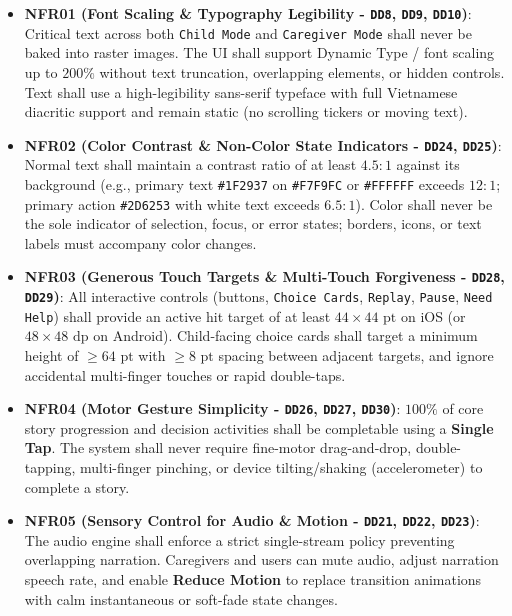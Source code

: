 \begin{itemize}
  \item \textbf{NFR01 (Font Scaling \& Typography Legibility - \texttt{DD8}, \texttt{DD9}, \texttt{DD10})}: Critical text across both \texttt{Child Mode} and \texttt{Caregiver Mode} shall never be baked into raster images. The UI shall support Dynamic Type / font scaling up to \textbf{$200\%$} without text truncation, overlapping elements, or hidden controls. Text shall use a high-legibility sans-serif typeface with full Vietnamese diacritic support and remain static (no scrolling tickers or moving text).
  \item \textbf{NFR02 (Color Contrast \& Non-Color State Indicators - \texttt{DD24}, \texttt{DD25})}: Normal text shall maintain a contrast ratio of at least \textbf{$4.5:1$} against its background (e.g., primary text \texttt{\#1F2937} on \texttt{\#F7F9FC} or \texttt{\#FFFFFF} exceeds $12:1$; primary action \texttt{\#2D6253} with white text exceeds $6.5:1$). Color shall never be the sole indicator of selection, focus, or error states; borders, icons, or text labels must accompany color changes.
  \item \textbf{NFR03 (Generous Touch Targets \& Multi-Touch Forgiveness - \texttt{DD28}, \texttt{DD29})}: All interactive controls (buttons, \texttt{Choice Cards}, \texttt{Replay}, \texttt{Pause}, \texttt{Need Help}) shall provide an active hit target of at least \textbf{$44 \times 44\text{ pt}$} on iOS (or \textbf{$48 \times 48\text{ dp}$} on Android). Child-facing choice cards shall target a minimum height of \textbf{$\ge 64\text{ pt}$} with \textbf{$\ge 8\text{ pt}$} spacing between adjacent targets, and ignore accidental multi-finger touches or rapid double-taps.
  \item \textbf{NFR04 (Motor Gesture Simplicity - \texttt{DD26}, \texttt{DD27}, \texttt{DD30})}: \textbf{$100\%$} of core story progression and decision activities shall be completable using a \textbf{Single Tap}. The system shall never require fine-motor drag-and-drop, double-tapping, multi-finger pinching, or device tilting/shaking (accelerometer) to complete a story.
  \item \textbf{NFR05 (Sensory Control for Audio \& Motion - \texttt{DD21}, \texttt{DD22}, \texttt{DD23})}: The audio engine shall enforce a strict single-stream policy preventing overlapping narration. Caregivers and users can mute audio, adjust narration speech rate, and enable \textbf{Reduce Motion} to replace transition animations with calm instantaneous or soft-fade state changes.

\end{itemize}
